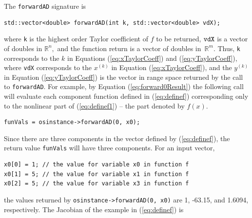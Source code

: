 \documentclass[11pt]{article}
\renewcommand{\_}{{\char"5F}}
\renewcommand{\{}{{\char"7B}}
\renewcommand{\}}{{\char"7D}}
\renewcommand{\^}{{\char"0D}}
\renewcommand{\'}{{\char"0D}}
\begin{document}
\begin{enumerate}[Step 1:]
The {\tt forwardAD} signature is
\begin{verbatim}
std::vector<double> forwardAD(int k, std::vector<double> vdX);
\end{verbatim}
where {\tt k} is the highest order Taylor coefficient of $f$ to be returned,  $\tt vdX$ is a vector of doubles in 
$ \mathbb{R}^{n},$ and the function return is a vector of doubles in~$\mathbb{R}^{m}.$  Thus, {\tt k} corresponds 
to the $k$ in Equations  (\ref{eq:xTaylorCoeff}) and (\ref{eq:yTaylorCoeff}),  where {\tt vdX} corresponds to the $x^{(k)}$ in Equation (\ref{eq:xTaylorCoeff}), and the $y^{(k)}$ in Equation (\ref{eq:yTaylorCoeff}) is the vector in range space returned by the call to {\tt  forwardAD}.    For example, by  Equation (\ref{eq:forward0Result}) the following call will evaluate each component function defined in (\ref{eq:definef}) corresponding only to the nonlinear part of (\ref{eq:definef1}) -- the part denoted by $f(x)$.
\begin{verbatim}
funVals = osinstance->forwardAD(0, x0);
\end{verbatim}
Since there are three components in the vector defined by  (\ref{eq:definef}), the return value  {\tt funVals} will have three components. For an input vector,
\begin{verbatim}
x0[0] = 1; // the value for variable x0 in function f
x0[1] = 5; // the value for variable x1 in function f
x0[2] = 5; // the value for variable x3 in function f
\end{verbatim}
the values returned by {\tt osinstance->forwardAD(0, x0)}  are 1, -63.15, and 1.6094, respectively.
The Jacobian of the example in (\ref{eq:definef}) is


\end{enumerate}
\end{document}
